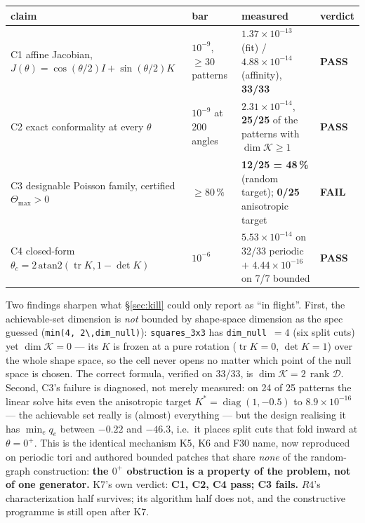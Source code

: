 \documentclass[10pt,a4paper]{article}
\newcommand{\fn}[1]{\nolinkurl{#1}}
\begin{document}
\begin{table}[h]\centering\footnotesize
\begin{tabular}{@{}p{28mm}p{16mm}p{78mm}p{10mm}@{}}
\toprule
claim & bar & measured & verdict \\
\midrule
C1 affine Jacobian, $J(\theta)=\cos(\theta/2)I+\sin(\theta/2)K$ & $10^{-9}$, $\ge30$ patterns &
$1.37\times10^{-13}$ (fit) / $4.88\times10^{-14}$ (affinity), \textbf{33/33} & \textbf{PASS} \\
C2 exact conformality at every $\theta$ & $10^{-9}$ at 200 angles & $2.31\times10^{-14}$,
\textbf{25/25} of the patterns with $\dim\mathcal K\ge1$ & \textbf{PASS} \\
C3 designable Poisson family, certified $\Theta_{\max}>0$ & $\ge80\,\%$ & \textbf{12/25 = 48\,\%}
(random target); \textbf{0/25} anisotropic target & \textbf{FAIL} \\
C4 closed-form $\theta_c=2\,\mathrm{atan2}(\operatorname{tr}K,1-\det K)$ & $10^{-6}$ &
$5.53\times10^{-14}$ on 32/33 periodic $+$ $4.44\times10^{-16}$ on 7/7 bounded & \textbf{PASS} \\
\bottomrule
\end{tabular}
\end{table}

Two findings sharpen what \S\ref{sec:kill} could only report as ``in flight''. First, the
achievable-set dimension is \emph{not} bounded by shape-space dimension as the spec guessed
(\fn{min(4, 2\,dim\_null)}): \fn{squares\_3x3} has \fn{dim\_null}~$=4$ (six split cuts) yet
$\dim\mathcal K = 0$ --- its $K$ is frozen at a pure rotation ($\operatorname{tr}K=0$,
$\det K=1$) over the whole shape space, so the cell never opens no matter which point of the
null space is chosen. The correct formula, verified on 33/33, is
$\dim\mathcal K = 2\,\operatorname{rank}\mathcal D$. Second, C3's failure is diagnosed, not
merely measured: on 24 of 25 patterns the linear solve hits even the anisotropic target
$K^*=\operatorname{diag}(1,-0.5)$ to $8.9\times10^{-16}$ --- the achievable set really is
(almost) everything --- but the design realising it has $\min_e q_e$ between $-0.22$ and $-46.3$,
i.e.\ it places split cuts that fold inward at $\theta=0^+$. This is the identical mechanism K5,
K6 and F30 name, now reproduced on periodic tori and authored bounded patches that share
\emph{none} of the random-graph construction: \textbf{the $0^+$ obstruction is a property of the
problem, not of one generator.} K7's own verdict: \textbf{C1, C2, C4 pass; C3 fails.} $R4$'s
characterization half survives; its algorithm half does not, and the constructive programme is
still open after K7.
\end{document}
